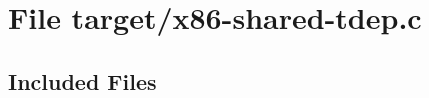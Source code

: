 

\section{File target/x86-shared-tdep.c}
\label{file_target/x86-shared-tdep.c}


\subsection*{Included Files}

